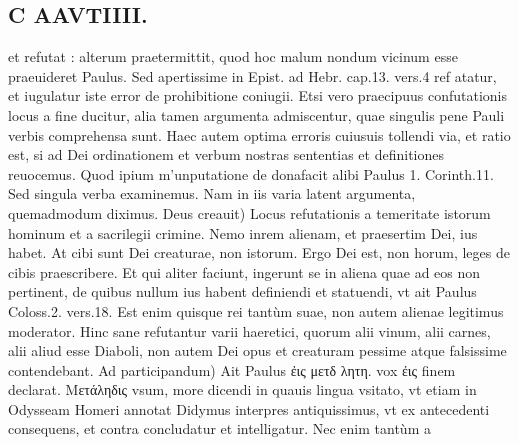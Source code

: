 \documentclass{article}
\begin{document}
\begin{pages}
\section*{C AAVTIIII. }
\marginpar{[ p.187 ]}\pstart et refutat : alterum praetermittit, quod hoc malum nondum vicinum esse praeuideret Paulus. Sed apertissime in Epist. ad Hebr. cap.13. vers.4 ref atatur, et iugulatur iste error de prohibitione coniugii. Etsi vero praecipuus confutationis locus a fine ducitur, alia tamen argumenta admiscentur, quae singulis pene Pauli verbis comprehensa sunt. Haec autem optima erroris cuiusuis tollendi via, et ratio est, si ad Dei ordinationem et verbum nostras sententias et definitiones reuocemus. Quod ipium m'unputatione de donafacit alibi Paulus 1. Corinth.11. Sed singula verba examinemus. Nam in iis varia latent argumenta, quemadmodum diximus.  \pend\pstart Deus creauit) Locus refutationis a temeritate istorum hominum et a sacrilegii crimine. Nemo inrem alienam, et praesertim Dei, ius habet. At cibi sunt Dei creaturae, non istorum. Ergo Dei est, non horum, leges de cibis praescribere. Et qui aliter faciunt, ingerunt se in aliena quae ad eos non pertinent, de quibus nullum ius habent definiendi et statuendi, vt ait Paulus Coloss.2. vers.18. Est enim quisque rei tantùm suae, non autem alienae legitimus moderator. Hinc sane refutantur varii haeretici, quorum alii vinum, alii carnes, alii aliud esse Diaboli, non autem Dei opus et creaturam pessime atque falsissime contendebant.  \pend\pstart Ad participandum) Ait Paulus ἐις μετδ λητη. vox ἐις finem declarat. Μετάληδις vsum, more dicendi in quauis lingua vsitato, vt etiam in Odysseam Homeri annotat Didymus interpres antiquissimus, vt ex antecedenti consequens, et contra concludatur et intelligatur. Nec enim tantùm a  \pend

\end{pages}
\end{document}
